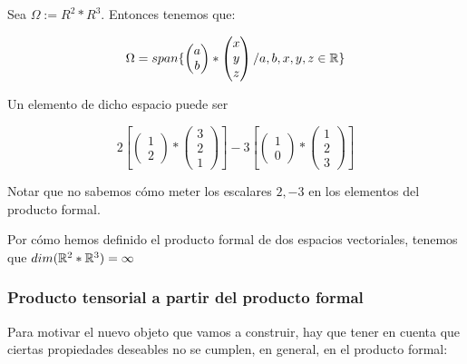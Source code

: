 \begin{ejemplo} \label{ej:prod_formal}

Sea $\Omega := R^2 \ast R^3$. Entonces tenemos que:

\begin{equation}
    \Omega = span \{
        \begin{pmatrix}
            a \\
            b
        \end{pmatrix}
        \ast
        \begin{pmatrix}
            x \\
            y \\
            z
        \end{pmatrix}
        / a, b, x, y, z \in \mathbb{R}
    \}
\end{equation}

Un elemento de dicho espacio puede ser

$$
2 \left[ \begin{pmatrix}1 \\ 2\end{pmatrix} \ast \begin{pmatrix}3 \\ 2 \\ 1 \end{pmatrix} \right]
- 3 \left[ \begin{pmatrix}1 \\ 0\end{pmatrix} \ast \begin{pmatrix}1 \\ 2 \\ 3 \end{pmatrix} \right]
$$

Notar que no sabemos cómo meter los escalares $2, -3$ en los elementos del producto formal.

Por cómo hemos definido el producto formal de dos espacios vectoriales, tenemos que $dim(\mathbb{R}^2 \ast \mathbb{R}^3) = \infty$

\end{ejemplo}

\subsubsection{Producto tensorial a partir del producto formal} \label{sec:cociente_prod_formal}

Para motivar el nuevo objeto que vamos a construir, hay que tener en cuenta que ciertas propiedades deseables no se cumplen, en general, en el producto formal:

